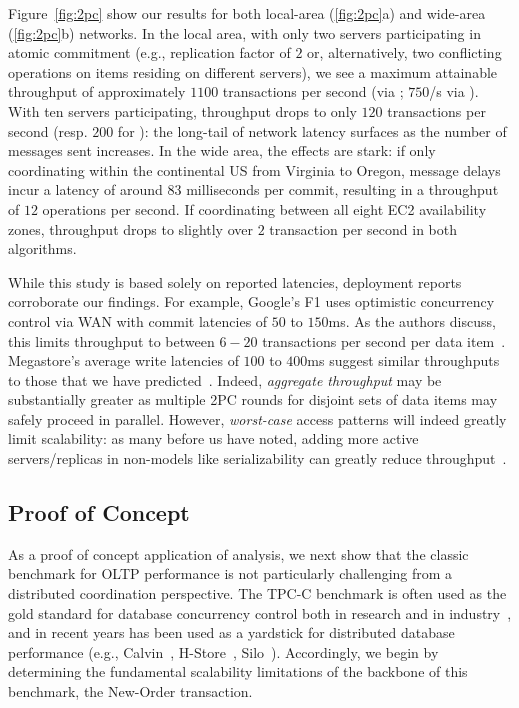 Figure~\ref{fig:2pc} show our results for both local-area
(\ref{fig:2pc}a) and wide-area (\ref{fig:2pc}b) networks.  In the
local area, with only two servers participating in atomic commitment
(e.g., replication factor of $2$ or, alternatively, two conflicting
operations on items residing on different servers), we see a maximum
attainable throughput of approximately $1100$ transactions per second
(via \dpc; $750$/s via \cpc). With ten servers participating, \dpc
throughput drops to only $120$ transactions per second (resp. $200$
for \cpc): the long-tail of network latency surfaces as the number of
messages sent increases. In the wide area, the effects are stark: if
only coordinating within the continental US from Virginia to Oregon,
\dpc message delays incur a latency of around $83$ milliseconds per
commit, resulting in a throughput of $12$ operations per second. If
coordinating between all eight EC2 availability zones, throughput
drops to slightly over $2$ transaction per second in both algorithms.

While this study is based solely on reported latencies, deployment
reports corroborate our findings. For example, Google's F1 uses
optimistic concurrency control via WAN with commit latencies of
$50$ to $150$ms. As the authors discuss, this limits throughput to between
$6-20$ transactions per second per data item~\cite{f1}. Megastore's
average write latencies of $100$ to $400$ms suggest similar throughputs to
those that we have predicted~\cite{megastore}. Indeed,
\textit{aggregate throughput} may be substantially greater as multiple
2PC rounds for disjoint sets of data items may safely proceed in
parallel. However, \textit{worst-case} access patterns will indeed
greatly limit scalability: as many before us have noted, adding more
active servers/replicas in non-\cfree models like serializability can
greatly reduce throughput~\cite{abadi-vll,calvin,jones-dtxn}.

\subsection{Proof of Concept}

As a proof of concept application of \cfreedom analysis, we next show
that the classic benchmark for OLTP performance is not particularly
challenging from a distributed coordination perspective. The TPC-C
benchmark is often used as the gold standard for database concurrency
control both in research and in industry~\cite{tpcc}, and in recent
years has been used as a yardstick for distributed database
performance (e.g., Calvin~\cite{calvin}, H-Store~\cite{hstore},
Silo~\cite{silo}). Accordingly, we begin by determining the
fundamental scalability limitations of the backbone of this benchmark,
the New-Order transaction.

